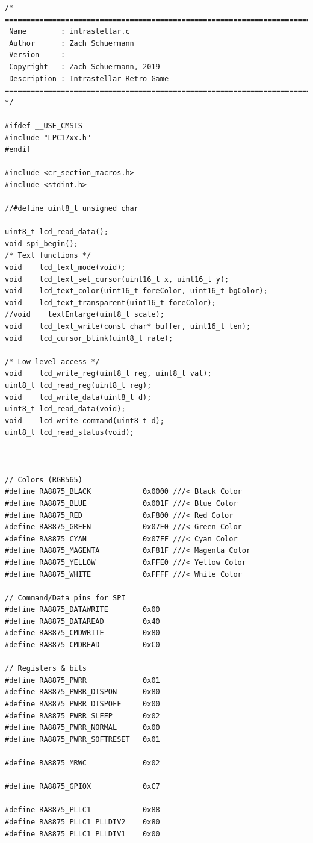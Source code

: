 \documentclass[a4paper, 12pt]{article}
\begin{document}
\begin{verbatim}
/*
===============================================================================
 Name        : intrastellar.c
 Author      : Zach Schuermann
 Version     :
 Copyright   : Zach Schuermann, 2019
 Description : Intrastellar Retro Game
===============================================================================
*/

#ifdef __USE_CMSIS
#include "LPC17xx.h"
#endif

#include <cr_section_macros.h>
#include <stdint.h>

//#define uint8_t unsigned char

uint8_t lcd_read_data();
void spi_begin();
/* Text functions */
void    lcd_text_mode(void);
void    lcd_text_set_cursor(uint16_t x, uint16_t y);
void    lcd_text_color(uint16_t foreColor, uint16_t bgColor);
void    lcd_text_transparent(uint16_t foreColor);
//void    textEnlarge(uint8_t scale);
void    lcd_text_write(const char* buffer, uint16_t len);
void    lcd_cursor_blink(uint8_t rate);

/* Low level access */
void    lcd_write_reg(uint8_t reg, uint8_t val);
uint8_t lcd_read_reg(uint8_t reg);
void    lcd_write_data(uint8_t d);
uint8_t lcd_read_data(void);
void    lcd_write_command(uint8_t d);
uint8_t lcd_read_status(void);



// Colors (RGB565)
#define	RA8875_BLACK            0x0000 ///< Black Color
#define	RA8875_BLUE             0x001F ///< Blue Color
#define	RA8875_RED              0xF800 ///< Red Color
#define	RA8875_GREEN            0x07E0 ///< Green Color
#define RA8875_CYAN             0x07FF ///< Cyan Color
#define RA8875_MAGENTA          0xF81F ///< Magenta Color
#define RA8875_YELLOW           0xFFE0 ///< Yellow Color
#define RA8875_WHITE            0xFFFF ///< White Color

// Command/Data pins for SPI
#define RA8875_DATAWRITE        0x00
#define RA8875_DATAREAD         0x40
#define RA8875_CMDWRITE         0x80
#define RA8875_CMDREAD          0xC0

// Registers & bits
#define RA8875_PWRR             0x01
#define RA8875_PWRR_DISPON      0x80
#define RA8875_PWRR_DISPOFF     0x00
#define RA8875_PWRR_SLEEP       0x02
#define RA8875_PWRR_NORMAL      0x00
#define RA8875_PWRR_SOFTRESET   0x01

#define RA8875_MRWC             0x02

#define RA8875_GPIOX            0xC7

#define RA8875_PLLC1            0x88
#define RA8875_PLLC1_PLLDIV2    0x80
#define RA8875_PLLC1_PLLDIV1    0x00


\end{verbatim}
\end{document}
